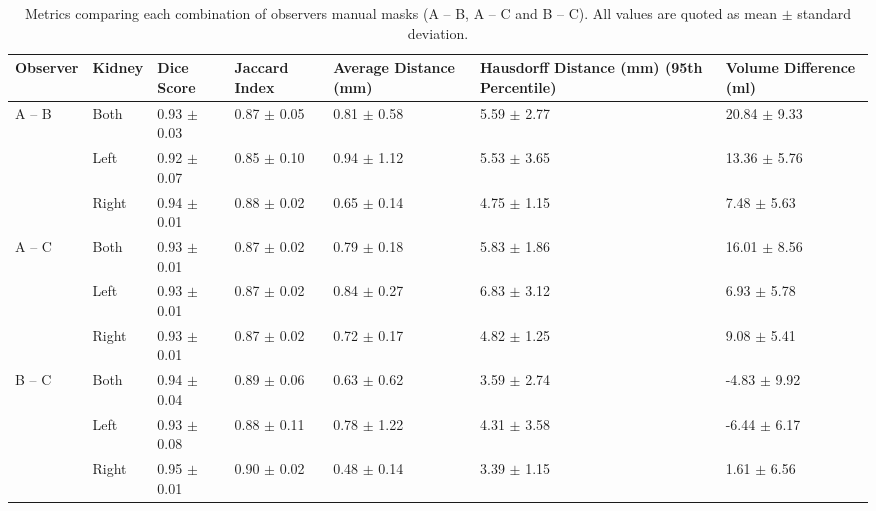 \begin{table}[H]
	\centering
	\begin{adjustbox}{width=1.0\textwidth, center}
	\begin{tabularx}{1.25\textwidth}{XX||X|X|X|X|X}
		Observer               & Kidney & Dice   Score  & Jaccard   Index & Average   Distance (mm) & Hausdorff   Distance (mm) (95th Percentile) & Volume   Difference (ml) \\ \hline
		\multirow{3}{*}{A – B} & Both   & 0.93   $\pm$ 0.03 & 0.87   $\pm$ 0.05   & 0.81   $\pm$ 0.58           & 5.59   $\pm$ 2.77                               & 20.84   $\pm$ 9.33           \\ \cline{2-7} 
		& Left   & 0.92 $\pm$ 0.07   & 0.85 $\pm$ 0.10     & 0.94 $\pm$ 1.12             & 5.53 $\pm$ 3.65                                 & 13.36 $\pm$ 5.76             \\ \cline{2-7} 
		& Right  & 0.94   $\pm$ 0.01 & 0.88   $\pm$ 0.02   & 0.65   $\pm$ 0.14           & 4.75   $\pm$ 1.15                               & 7.48   $\pm$ 5.63            \\ \hline
		\multirow{3}{*}{A – C} & Both   & 0.93 $\pm$ 0.01   & 0.87 $\pm$ 0.02     & 0.79 $\pm$ 0.18             & 5.83 $\pm$ 1.86                                 & 16.01 $\pm$ 8.56             \\ \cline{2-7} 
		& Left   & 0.93   $\pm$ 0.01 & 0.87   $\pm$ 0.02   & 0.84   $\pm$ 0.27           & 6.83   $\pm$ 3.12                               & 6.93   $\pm$ 5.78            \\ \cline{2-7} 
		& Right  & 0.93 $\pm$ 0.01   & 0.87 $\pm$ 0.02     & 0.72 $\pm$ 0.17             & 4.82 $\pm$ 1.25                                 & 9.08 $\pm$ 5.41              \\ \hline
		\multirow{3}{*}{B – C} & Both   & 0.94   $\pm$ 0.04 & 0.89   $\pm$ 0.06   & 0.63   $\pm$ 0.62           & 3.59   $\pm$ 2.74                               & -4.83   $\pm$ 9.92           \\ \cline{2-7} 
		& Left   & 0.93 $\pm$ 0.08   & 0.88 $\pm$ 0.11     & 0.78 $\pm$ 1.22             & 4.31 $\pm$ 3.58                                 & -6.44 $\pm$ 6.17             \\ \cline{2-7} 
		& Right  & 0.95   $\pm$ 0.01 & 0.90   $\pm$ 0.02   & 0.48   $\pm$ 0.14           & 3.39   $\pm$ 1.15                               & 1.61   $\pm$ 6.56           
	\end{tabularx}
	\end{adjustbox}
	\caption{Metrics comparing each combination of observers manual masks (A – B, A – C and B – C). All values are quoted as mean $\pm$ standard deviation.}
\label{tab:ml_manual_metrics}
\end{table}

